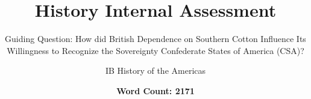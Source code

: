 \documentclass{article}
\title{History Internal Assessment}
\subtitle{Guiding Question: How did British Dependence on Southern Cotton Influence Its Willingness to Recognize the Sovereignty Confederate States of America (CSA)?}
\author{IB History of the Americas}
\date{\textbf{Word Count: 2171}}
\numberwithin{equation}{section}
\numberwithin{figure}{section}
\begin{document}
\clearpage\maketitle
\thispagestyle{empty}
\newpage

\tableofcontents
\newpage

\renewcommand{\thesection}{Section \Alph{section}}
\renewcommand{\thesubsection}{\Alph{section}.\arabic{subsection}}
\renewcommand{\thefigure}{\Alph{section}.\roman{figure}}

\pagestyle{fancy}
\fancyhf{}
\fancyhead[R]{\thepage}

\section{}


\section{}


\section{} 


\printbibliography
\end{document}
